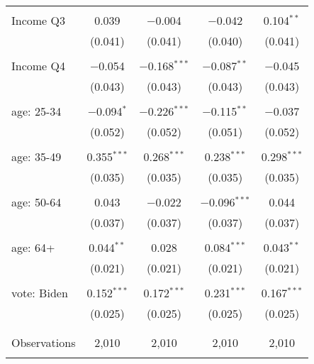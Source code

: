 \begin{tabular}{@{\extracolsep{5pt}}lcccc}
  & & & & \\ 
 Income Q3 & 0.039 & $-$0.004 & $-$0.042 & 0.104$^{**}$ \\ 
  & (0.041) & (0.041) & (0.040) & (0.041) \\ 
  & & & & \\ 
 Income Q4 & $-$0.054 & $-$0.168$^{***}$ & $-$0.087$^{**}$ & $-$0.045 \\ 
  & (0.043) & (0.043) & (0.043) & (0.043) \\ 
  & & & & \\ 
 age: 25-34 & $-$0.094$^{*}$ & $-$0.226$^{***}$ & $-$0.115$^{**}$ & $-$0.037 \\ 
  & (0.052) & (0.052) & (0.051) & (0.052) \\ 
  & & & & \\ 
 age: 35-49 & 0.355$^{***}$ & 0.268$^{***}$ & 0.238$^{***}$ & 0.298$^{***}$ \\ 
  & (0.035) & (0.035) & (0.035) & (0.035) \\ 
  & & & & \\ 
 age: 50-64 & 0.043 & $-$0.022 & $-$0.096$^{***}$ & 0.044 \\ 
  & (0.037) & (0.037) & (0.037) & (0.037) \\ 
  & & & & \\ 
 age: 64+ & 0.044$^{**}$ & 0.028 & 0.084$^{***}$ & 0.043$^{**}$ \\ 
  & (0.021) & (0.021) & (0.021) & (0.021) \\ 
  & & & & \\ 
 vote: Biden & 0.152$^{***}$ & 0.172$^{***}$ & 0.231$^{***}$ & 0.167$^{***}$ \\ 
  & (0.025) & (0.025) & (0.025) & (0.025) \\ 
  & & & & \\ 
\hline \\[-1.8ex] 

Observations & 2,010 & 2,010 & 2,010 & 2,010 \\ 
\hline 
\hline \\[-1.8ex] 
\end{tabular} 